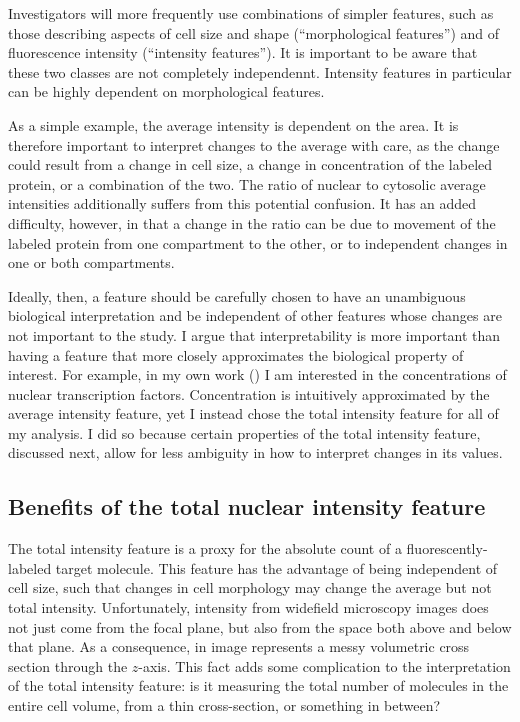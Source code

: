 Investigators will more frequently use combinations of
simpler features, such as those describing aspects of cell
size and shape (``morphological features'') and
of fluorescence intensity (``intensity features''). It is
important to be aware that these two classes are not completely
independennt. Intensity features in particular can be highly
dependent on morphological features.


As a simple example,
the average intensity is dependent on the area.
It is therefore important to interpret changes to the average
with care, as the change could result from  a
change in cell size, a change in concentration of the labeled
protein, or a combination of the two.
The ratio of nuclear to cytosolic average intensities
additionally suffers from this potential confusion. It has
an added difficulty, however, in that a change in the ratio
can be due to movement of the labeled protein from one compartment
to the other, or to independent changes in one or both compartments.


Ideally, then, a
feature should be carefully chosen to have an unambiguous biological
interpretation and be independent of
other features whose changes are not important to
the study. I argue that interpretability is more important than having
a feature that more closely approximates the biological property
of interest. For example, in my own work ()
I am interested in the
concentrations of nuclear transcription factors. Concentration
is intuitively approximated by the average intensity feature, yet
I instead chose the total intensity feature for all of my analysis.
I did so because certain properties of the total intensity feature,
discussed next, allow for less ambiguity in how to interpret
changes in its values.


\subsection{Benefits of the total nuclear intensity feature}
\label{imaging:totalIntensity}


The total intensity
feature is a proxy for the absolute count
of a fluorescently-labeled target molecule. This feature has the
advantage of being independent of cell size, such that changes
in cell morphology may change the average but not total
intensity. Unfortunately, intensity from widefield microscopy images
does not just come from the focal plane, but also from the
space both above and below that plane. As a consequence,
in image represents a messy volumetric cross section through the $z$-axis.
This fact adds some complication to the interpretation of the
total intensity feature: is it measuring the total number of
molecules in the entire cell volume, from a thin cross-section,
or something in between?


